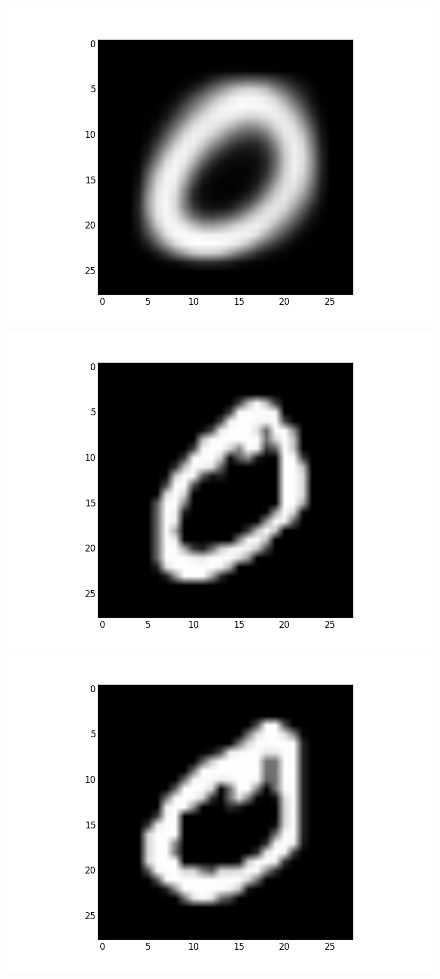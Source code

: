 \documentclass[submit]{harvardml}
\begin{document}
\begin{figure}[ht]
    \centering
    \includegraphics[scale=0.20]{mean-7}
    \includegraphics[scale=0.20]{representative-7-0}
    \includegraphics[scale=0.20]{representative-7-1}

\end{figure}
\end{document}
